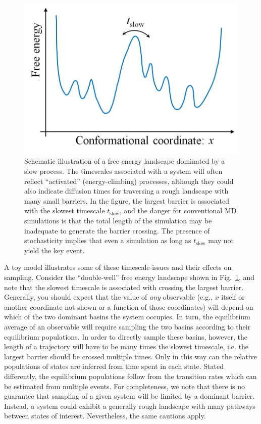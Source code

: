 


\begin{figure}
  \centering
  \includegraphics[width=0.9\linewidth]{figures/1d-landscape-tslow}
  \caption{
  \label{fig:landscape} 
  Schematic illustration of a free energy landscape dominated by a slow process.
  The timescales associated with a system will often reflect ``activated'' (energy-climbing) processes, although they could also indicate diffusion times for traversing a rough landscape with many small barriers.
  In the figure, the largest barrier is associated with the slowest timescale $t_{\mathrm{slow}}$, and the danger for conventional MD simulations is that the total length of the simulation may be inadequate to generate the barrier crossing.
  The presence of stochasticity implies that even a simulation as long as $t_{\mathrm{slow}}$ may not yield the key event.
  }
\end{figure}

A toy model illustrates some of these timescale-issues and their effects on sampling.
Consider the ``double-well'' free energy landscape shown in Fig.\ \ref{fig:landscape}, and note that the slowest timescale is associated with crossing the largest barrier.  Generally, you should expect that the value of \emph{any} observable (e.g., $x$ itself or another coordinate not shown or a function of those coordinates) will depend on which of the two dominant basins the system occupies.  In turn, the equilibrium average of an observable will require sampling the two basins according to their equilibrium populations.  In order to directly sample these basins, however, the length of a trajectory will have to be many times the slowest timescale, i.e. the largest barrier should be crossed multiple times.  Only in this way can the relative populations of states are inferred from time spent in each state.  Stated differently, the equilibrium populations follow from the transition rates \cite{Zuckerman2011,Chou11,Kolmogoroff1936} which can be estimated from multiple events.  For completeness, we note that there is no guarantee that sampling of a given system will be limited by a dominant barrier.  Instead, a system could exhibit a generally rough landscape with many pathways between states of interest.
Nevertheless, the same cautions apply.

